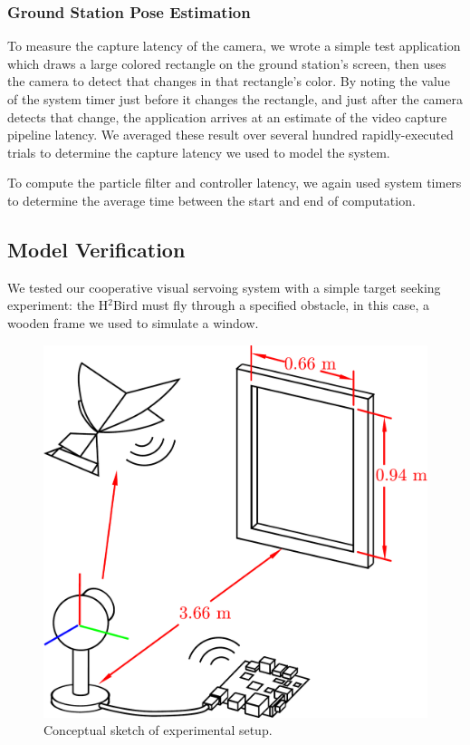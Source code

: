 \documentclass{aamas2013}
\begin{document}
\subsubsection{Ground Station Pose Estimation}
To measure the capture latency of the camera, we wrote a simple test 
application which draws a large colored rectangle on the ground station's 
screen, then uses the camera to detect that changes in that rectangle's 
color. By noting the value of the system timer just before it changes the 
rectangle, and just after the camera detects that change, the application 
arrives at an estimate of the video capture pipeline latency. We averaged 
these result over several hundred rapidly-executed trials to determine the 
capture latency we used to model the system.

To compute the particle filter and controller latency, we again used system 
timers to determine the average time between the start and end of computation.

\subsection{Model Verification}
\label{sec:experiments_verification}

We tested our cooperative visual servoing system with a simple target seeking
experiment: the H$^2$Bird must fly through a specified obstacle, in this 
case, a wooden frame we used to simulate a window.

\begin{figure}[tb]
\centering
\includegraphics[width=\linewidth]{figures/experiment_cartoon.pdf}
\caption{Conceptual sketch of experimental setup.}
\label{fig:experiment_cartoon}
\end{figure}
\end{document}
